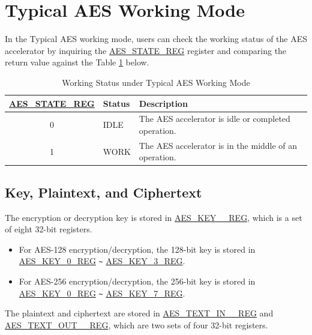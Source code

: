 \documentclass[main\_\_EN.tex]{subfiles}
\begin{document}
\section{Typical AES Working Mode}\label{sec:aes-typical-modes}

In the Typical AES working mode,
users can check the working status of the AES accelerator by inquiring the \hyperref[regdesc:AESSTATEREG]{AES\_STATE\_REG} register and comparing the return value against the Table \ref{tab:aes-state-value-typical} below.

\begin{longtable}[c]{ | c | l | l| }
\caption{Working Status under Typical AES Working Mode}
\label{tab:aes-state-value-typical}
\\\hline
\rowcolor{lightgray}
\hyperref[regdesc:AESSTATEREG]{AES\_STATE\_REG} & Status &  Description \\ \hline

    0                   & IDLE      &   The AES accelerator is idle or completed operation.\\ \hline
    1                   & WORK      &   The AES accelerator is in the middle of an operation.     \\ \hline
\end{longtable}

\subsection{Key, Plaintext, and Ciphertext}

The encryption or decryption key is stored in \hyperref[regdesc:AESKEYnREG]{AES\_KEY\_\_REG}, which is a set of eight 32-bit registers.

\begin{itemize}
    \item For AES-128 encryption/decryption, the 128-bit key is stored in \hyperref[regdesc:AESKEYnREG]{AES\_KEY\_0\_REG} \verb+~+ \hyperref[regdesc:AESKEYnREG]{AES\_KEY\_3\_REG}.
    \item For AES-256 encryption/decryption, the 256-bit key is stored in \hyperref[regdesc:AESKEYnREG]{AES\_KEY\_0\_REG} \verb+~+ \hyperref[regdesc:AESKEYnREG]{AES\_KEY\_7\_REG}.
\end{itemize}

The plaintext and ciphertext are stored in \hyperref[regdesc:AESTEXTINnREG]{AES\_TEXT\_IN\_\_REG} and \hyperref[regdesc:AESTEXTOUTnREG]{AES\_TEXT\_OUT\_\_REG}, which are two sets of four 32-bit registers.
\end{document}
